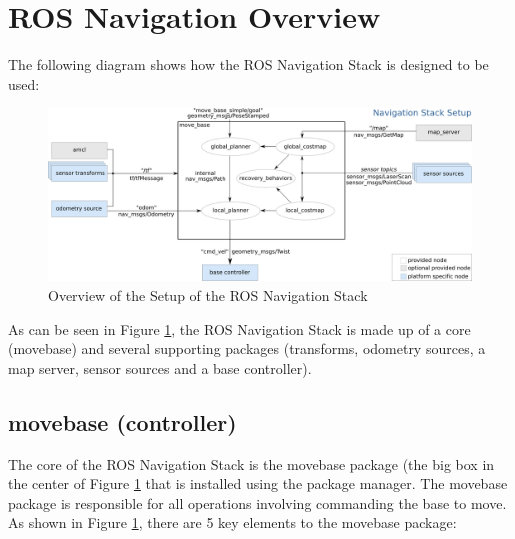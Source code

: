\newpage

\section{ROS Navigation Overview}

The following diagram shows how the ROS Navigation Stack is designed to be used:

\begin{figure}[h!]
\centering
\includegraphics[scale=.35]{Photos/rosnavoverview.png}
\caption{Overview of the Setup of the ROS Navigation Stack}
\label{fig:rosnavoverview}
\end{figure} 

\noindent As can be seen in Figure \ref{fig:rosnavoverview}, the ROS Navigation Stack is made up of a core (move\textunderscore base) and several supporting packages (transforms, odometry sources, a map server, sensor sources and a base controller). 

\subsection{move\textunderscore base (controller)}

The core of the ROS Navigation Stack is the move\textunderscore base package (the big box in the center of Figure \ref{fig:rosnavoverview} that is installed using the package manager. The move\textunderscore base package is responsible for all operations involving commanding the base to move. As shown in Figure \ref{fig:rosnavoverview}, there are 5 key elements to the move\textunderscore base package:

